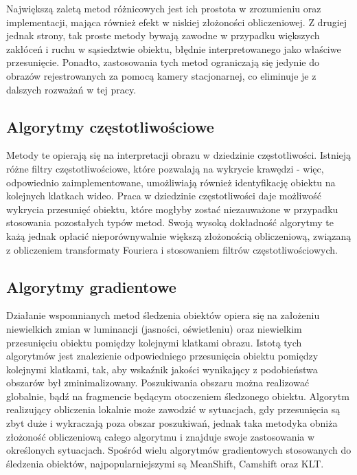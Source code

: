 Największą zaletą metod różnicowych jest ich prostota w zrozumieniu oraz implementacji, mająca również efekt w niskiej złożoności obliczeniowej. 
Z drugiej jednak strony, tak proste metody bywają zawodne w przypadku większych zakłóceń i ruchu w sąsiedztwie obiektu, błędnie interpretowanego jako właściwe przesunięcie. 
Ponadto, zastosowania tych metod ograniczają się jedynie do obrazów rejestrowanych za pomocą kamery stacjonarnej, co eliminuje je z dalszych rozważań w tej pracy. 


\subsection{Algorytmy częstotliwościowe}

Metody te opierają się na interpretacji obrazu w dziedzinie częstotliwości. 
Istnieją różne filtry częstotliwościowe, które pozwalają na wykrycie krawędzi - więc, odpowiednio zaimplementowane, umożliwiają również identyfikację obiektu na kolejnych klatkach wideo. %
Praca w dziedzinie częstotliwości daje możliwość wykrycia przesunięć obiektu, które mogłyby zostać niezauważone w przypadku stosowania pozostałych typów metod. 
Swoją wysoką dokładność algorytmy te każą jednak opłacić nieporównywalnie większą złożonością obliczeniową, związaną z obliczeniem transformaty Fouriera i stosowaniem filtrów częstotliwościowych. %

\subsection{Algorytmy gradientowe}

Działanie wspomnianych metod śledzenia obiektów opiera się na założeniu niewielkich zmian w luminancji (jasności, oświetleniu) oraz niewielkim przesunięciu obiektu pomiędzy kolejnymi klatkami obrazu. %
Istotą tych algorytmów jest znalezienie odpowiedniego przesunięcia obiektu pomiędzy kolejnymi klatkami, tak, aby wskaźnik jakości wynikający z podobieństwa obszarów był zminimalizowany. 
Poszukiwania obszaru można realizować globalnie, bądź na fragmencie będącym otoczeniem śledzonego obiektu. 
Algorytm realizujący obliczenia lokalnie może zawodzić w sytuacjach, gdy przesunięcia są zbyt duże i wykraczają poza obszar poszukiwań, jednak taka metodyka obniża złożoność obliczeniową całego algorytmu i znajduje swoje zastosowania w określonych sytuacjach. %
Spośród wielu algorytmów gradientowych stosowanych do śledzenia obiektów, najpopularniejszymi są MeanShift, Camshift oraz KLT. %


